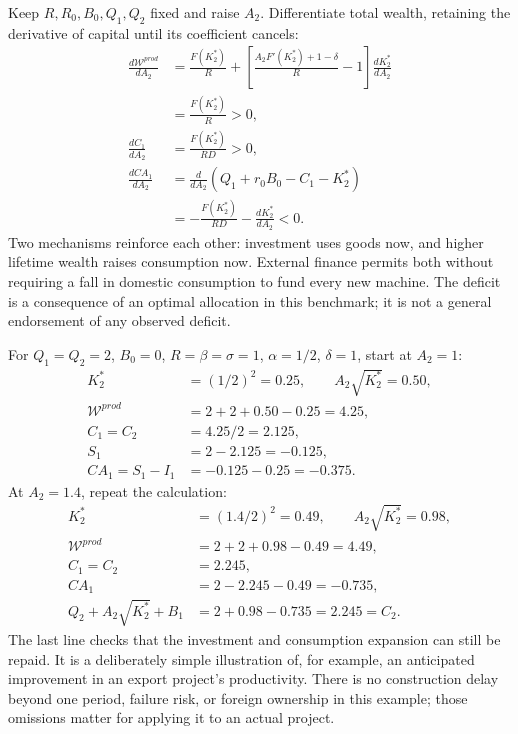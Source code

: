 Keep $R,R_0,B_0,Q_1,Q_2$ fixed and raise $A_2$. Differentiate total wealth,
retaining the derivative of capital until its coefficient cancels:
\begin{align}
 \frac{d\mathcal W^{prod}}{dA_2}
 &=\frac{F(K_2^*)}{R}
 +\left[\frac{A_2F'(K_2^*)+1-\delta}{R}-1\right]
       \frac{dK_2^*}{dA_2}\\
 &=\frac{F(K_2^*)}{R}>0,\\
 \frac{dC_1}{dA_2}&=\frac{F(K_2^*)}{RD}>0,\\
 \frac{dCA_1}{dA_2}
 &=\frac{d}{dA_2}(Q_1+r_0B_0-C_1-K_2^*)\\
 &=-\frac{F(K_2^*)}{RD}-\frac{dK_2^*}{dA_2}<0.
\end{align}
Two mechanisms reinforce each other: investment uses goods now, and higher
lifetime wealth raises consumption now. External finance permits both
without requiring a fall in domestic consumption to fund every new machine.
The deficit is a consequence of an optimal allocation in this benchmark;
it is not a general endorsement of any observed deficit.

For $Q_1=Q_2=2$, $B_0=0$, $R=\beta=\sigma=1$, $\alpha=1/2$,
$\delta=1$, start at $A_2=1$:
\begin{align}
 K_2^*&=(1/2)^2=0.25,\qquad A_2\sqrt{K_2^*}=0.50,\\
 \mathcal W^{prod}&=2+2+0.50-0.25=4.25,\\
 C_1=C_2&=4.25/2=2.125,\\
 S_1&=2-2.125=-0.125,\\
 CA_1=S_1-I_1&=-0.125-0.25=-0.375.
\end{align}
At $A_2=1.4$, repeat the calculation:
\begin{align}
 K_2^*&=(1.4/2)^2=0.49,\qquad A_2\sqrt{K_2^*}=0.98,\\
 \mathcal W^{prod}&=2+2+0.98-0.49=4.49,\\
 C_1=C_2&=2.245,\\
 CA_1&=2-2.245-0.49=-0.735,\\
 Q_2+A_2\sqrt{K_2^*}+B_1&=2+0.98-0.735=2.245=C_2.
\end{align}
The last line checks that the investment and consumption expansion can still
be repaid. It is a deliberately simple illustration of, for example, an
anticipated improvement in an export project's productivity. There is no
construction delay beyond one period, failure risk, or foreign ownership in
this example; those omissions matter for applying it to an actual project.

